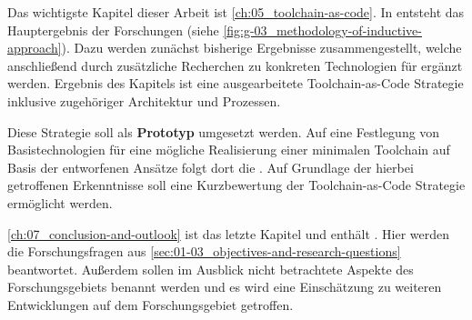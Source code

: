 Das wichtigste Kapitel dieser Arbeit ist \autoref{ch:05_toolchain-as-code}. In  entsteht das Hauptergebnis der Forschungen (siehe \autoref{fig:g-03_methodology-of-inductive-approach}). Dazu werden zunächst bisherige Ergebnisse zusammengestellt, welche anschließend durch zusätzliche Recherchen zu konkreten Technologien für  ergänzt werden. Ergebnis des Kapitels ist eine ausgearbeitete Toolchain-as-Code Strategie inklusive zugehöriger Architektur und Prozessen.

Diese Strategie soll als \textbf{Prototyp} umgesetzt werden. Auf eine Festlegung von Basistechnologien für eine mögliche Realisierung einer minimalen Toolchain auf Basis der entworfenen Ansätze folgt dort die . Auf Grundlage der hierbei getroffenen Erkenntnisse soll eine Kurzbewertung der Toolchain-as-Code Strategie ermöglicht werden.

\autoref{ch:07_conclusion-and-outlook} ist das letzte Kapitel und enthält . Hier werden die Forschungsfragen aus \autoref{sec:01-03_objectives-and-research-questions} beantwortet. Außerdem sollen im Ausblick nicht betrachtete Aspekte des Forschungsgebiets benannt werden und es wird eine Einschätzung zu weiteren Entwicklungen auf dem Forschungsgebiet getroffen.
